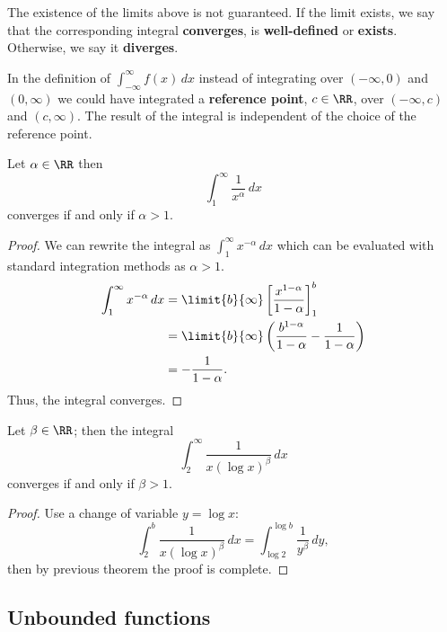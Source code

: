 \documentclass[12pt, a4paper]{article}
\begin{document}
\begin{mdremark}
    The existence of the limits above is not guaranteed. If the limit exists, we say that the corresponding integral \textbf{converges}, is \textbf{well-defined} or \textbf{exists}. Otherwise, we say it \textbf{diverges}.
\end{mdremark}

\begin{mdnote}
    In the definition of \(\int_{-\infty}^{\infty} f(x) \, dx\) instead of integrating over \((-\infty,0)\) and \((0,\infty)\) we could have integrated a \textbf{reference point}, \(c \in \RR\), over \((-\infty, c)\) and \((c,\infty)\). The result of the integral is independent of the choice of the reference point.
\end{mdnote}

\begin{mdthm}
    Let \(\alpha \in \RR\) then
    \[\int_1^{\infty} \frac{1}{x^{\alpha}} \, dx\]
    converges if and only if \(\alpha >1\).
\end{mdthm}

\begin{proof}
    We can rewrite the integral as \(\int_1^{\infty} x^{-\alpha} \, dx\) which can be evaluated with standard integration methods as \(\alpha>1\).
    \[\begin{aligned}
        \int_1^{\infty} x^{-\alpha} \, dx &= \limit{b}{\infty} \left[ \frac{x^{1-\alpha}}{1-\alpha}\right]_1^b \\
        &= \limit{b}{\infty}\left(\frac{b^{1-\alpha}}{1-\alpha} - \frac{1}{1-\alpha}\right)\\
        &= -\frac{1}{1-\alpha}.
    \end{aligned}\]
    Thus, the integral converges.
\end{proof}

\begin{mdthm}
    Let \(\beta \in \RR\); then the integral
    \[\int_2^{\infty} \frac{1}{x(\log x)^{\beta}} \, dx\]
    converges if and only if \(\beta>1\).
\end{mdthm}

\begin{proof}
    Use a change of variable \(y=\log{x}\):
    \[\int_2^b \frac{1}{x(\log x)^{\beta}} \, dx =\int_{\log{2}}^{\log{b}} \frac{1}{y^{\beta}} \, dy,\]
    then by previous theorem the proof is complete.
\end{proof}

\subsection{Unbounded functions}
\end{document}
